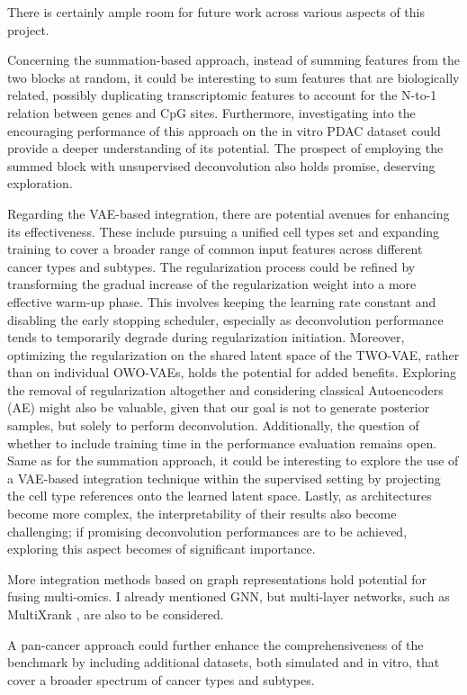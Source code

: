 \documentclass{article}
\begin{document}
There is certainly ample room for future work across various aspects of this project.

Concerning the summation-based approach, instead of summing features from the two blocks at random, it could be interesting to sum features that are biologically related, possibly duplicating transcriptomic features to account for the N-to-1 relation between genes and CpG sites.
Furthermore, investigating into the encouraging performance of this approach on the in vitro PDAC dataset could provide a deeper understanding of its potential. 
The prospect of employing the summed block with unsupervised deconvolution also holds promise, deserving exploration.

Regarding the VAE-based integration, there are potential avenues for enhancing its effectiveness. 
These include pursuing a unified cell types set and expanding training to cover a broader range of common input features across different cancer types and subtypes. 
The regularization process could be refined by transforming the gradual increase of the regularization weight into a more effective warm-up phase. 
This involves keeping the learning rate constant and disabling the early stopping scheduler, especially as deconvolution performance tends to temporarily degrade during regularization initiation.
Moreover, optimizing the regularization on the shared latent space of the TWO-VAE, rather than on individual OWO-VAEs, holds the potential for added benefits. 
Exploring the removal of regularization altogether and considering classical Autoencoders (AE) might also be valuable, given that our goal is not to generate posterior samples, but solely to perform deconvolution. 
Additionally, the question of whether to include training time in the performance evaluation remains open.
Same as for the summation approach, it could be interesting to explore the use of a VAE-based integration technique within the supervised setting by projecting the cell type references onto the learned latent space. 
Lastly, as architectures become more complex, the interpretability of their results also become challenging; if promising deconvolution performances are to be achieved, exploring this aspect becomes of significant importance.

More integration methods based on graph representations hold potential for fusing multi-omics.
I already mentioned GNN, but multi-layer networks, such as MultiXrank \cite{MultiXrank}, are also to be considered.

A pan-cancer approach could further enhance the comprehensiveness of the benchmark by including additional datasets, both simulated and in vitro, that cover a broader spectrum of cancer types and subtypes.
\end{document}
